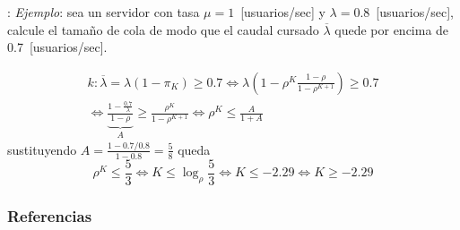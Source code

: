 \documentclass[xcolor={x11names}]{beamer}
\begin{document}
\begin{frame}{\secname: \subsecname}
    \textit{Ejemplo}: sea un servidor con
    tasa $\mu=1$~[usuarios/sec] y
    $\lambda=0.8$~[usuarios/sec], calcule
    el tamaño de cola de modo que el
    caudal cursado $\overline{\lambda}$
    quede por encima de 0.7~[usuarios/sec].

    \vfill

    \begin{multline*}
        k: \overline{\lambda}=
        \lambda(1-\pi_K)\geq0.7
        \Longleftrightarrow
        \lambda\left(1-\rho^K\frac{1-\rho}{1-\rho^{K+1}} \right)
        \geq0.7\\
        \Longleftrightarrow
        \underbrace{\frac{1-\frac{0.7}{\lambda}}{1-\rho}}_{A}
        \geq \frac{\rho^K}{1-\rho^{K+1}}
        \Longleftrightarrow
        \rho^K\leq \frac{A}{1+A}
    \end{multline*}
    sustituyendo $A=\tfrac{1-0.7/0.8}{1-0.8}=\tfrac{5}{8}$
    queda
    \begin{equation*}
        \rho^K\leq\frac{5}{3}
        \Longleftrightarrow
        K\leq\log_\rho\frac{5}{3}
        \Longleftrightarrow
        K\leq-2.29
        \Longleftrightarrow
        K\geq-2.29
    \end{equation*}
\end{frame}



\begin{frame}[allowframebreaks]
        \frametitle{Referencias}
        
        
\end{frame}
\end{document}
